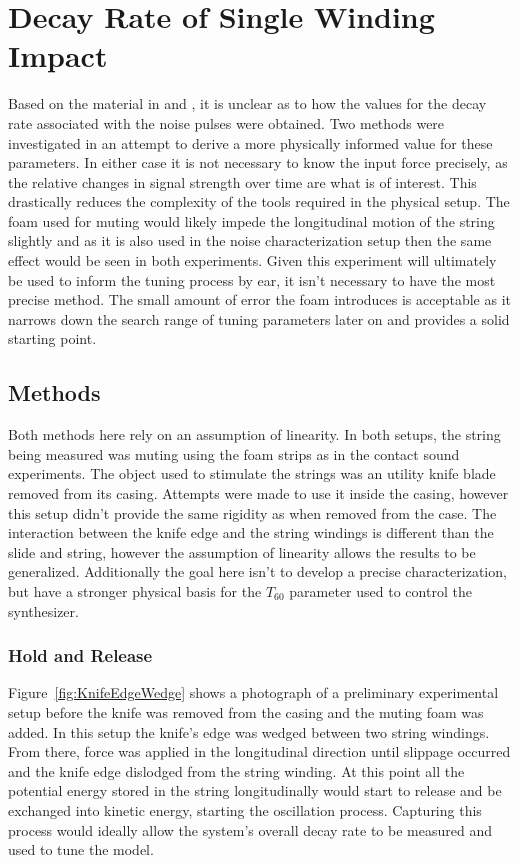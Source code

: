 \documentclass[../main.tex]{subfiles}
\begin{document}
\section{Decay Rate of Single Winding Impact}
\label{sec:DecayRateMeasurement}
Based on the material in  and , it is unclear as to how the values for the decay rate associated with the noise pulses were obtained. Two methods were investigated in an attempt to derive a more physically informed value for these parameters. In either case it is not necessary to know the input force precisely, as the relative changes in signal strength over time are what is of interest. This drastically reduces the complexity of the tools required in the physical setup. The foam used for muting would likely impede the longitudinal motion of the string slightly and as it is also used in the noise characterization setup then the same effect would be seen in both experiments. Given this experiment will ultimately be used to inform the tuning process by ear, it isn't necessary to have the most precise method. The small amount of error the foam introduces is acceptable as it narrows down the search range of tuning parameters later on and provides a solid starting point.

\subsection{Methods}
Both methods here rely on an assumption of linearity. In both setups, the string being measured was muting using the foam strips as in the contact sound experiments. The object used to stimulate the strings was an utility knife blade removed from its casing. Attempts were made to use it inside the casing, however this setup didn't provide the same rigidity as when removed from the case. The interaction between the knife edge and the string windings is different than the slide and string, however the assumption of linearity  allows the results to be generalized. Additionally the goal here isn't to develop a precise characterization, but have a stronger physical basis for the $T_{60}$ parameter used to control the synthesizer. 

\subsubsection{Hold and Release}
Figure~\ref{fig:KnifeEdgeWedge} shows a photograph of a preliminary experimental setup before the knife was removed from the casing and the muting foam was added. In this setup the knife's edge was wedged between two string windings. From there, force was applied in the longitudinal direction until slippage occurred and the knife edge dislodged from the string winding. At this point all the potential energy stored in the string longitudinally would start to release and be exchanged into kinetic energy, starting the oscillation process. Capturing this process would ideally allow the system's overall decay rate to be measured and used to tune the model.
\end{document}
